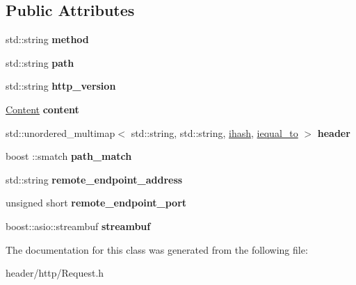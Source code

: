 \subsection*{Public Attributes}
\begin{DoxyCompactItemize}
\item 
\mbox{\label{classhttp_1_1_request_a5354750b436f8df0529be7b7f0fb64f5}} 
std\+::string {\bfseries method}
\item 
\mbox{\label{classhttp_1_1_request_a6f236417c127c43c3f1b88b273cc4b41}} 
std\+::string {\bfseries path}
\item 
\mbox{\label{classhttp_1_1_request_a8c4c3711d2fc0a8e6919464e675ac341}} 
std\+::string {\bfseries http\+\_\+version}
\item 
\mbox{\label{classhttp_1_1_request_ad5f6091d7e6c18a6336980267d6957ae}} 
\hyperlink{classhttp_1_1_content}{Content} {\bfseries content}
\item 
\mbox{\label{classhttp_1_1_request_ab0580a45fa490fc3da79661e2aa8832f}} 
std\+::unordered\+\_\+multimap$<$ std\+::string, std\+::string, \hyperlink{classhttp_1_1_request_1_1ihash}{ihash}, \hyperlink{classhttp_1_1_request_1_1iequal__to}{iequal\+\_\+to} $>$ {\bfseries header}
\item 
\mbox{\label{classhttp_1_1_request_a4b0990eb5528b0528ce22aaa8653f7ba}} 
boost \+::smatch {\bfseries path\+\_\+match}
\item 
\mbox{\label{classhttp_1_1_request_a138120e59c0344af3f950ccb6dd9953e}} 
std\+::string {\bfseries remote\+\_\+endpoint\+\_\+address}
\item 
\mbox{\label{classhttp_1_1_request_ab2d364469301ca83ff3463621e9946c2}} 
unsigned short {\bfseries remote\+\_\+endpoint\+\_\+port}
\item 
\mbox{\label{classhttp_1_1_request_ac96f11f3d3791a7634a7ccfd631afa3f}} 
boost\+::asio\+::streambuf {\bfseries streambuf}
\end{DoxyCompactItemize}


The documentation for this class was generated from the following file\+:\begin{DoxyCompactItemize}
\item 
header/http/Request.\+h\end{DoxyCompactItemize}
